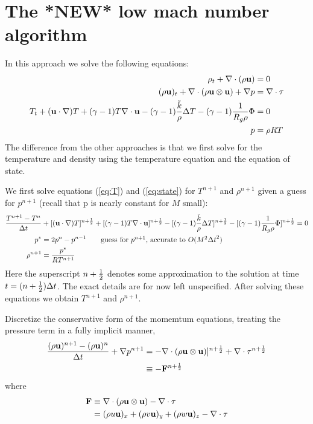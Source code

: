 \documentclass[10pt]{article}
\begin{document}
\clearpage
\section{The *NEW* low mach number algorithm}


In this approach we solve the following equations:
\begin{align}
   \rho_t + \nabla\cdot( \rho{\bf u} ) &= 0 \label{eq:rho} \\
   (\rho{\bf u})_t + \nabla\cdot( \rho {\bf u}\otimes {\bf u} ) + \nabla p & = \nabla\cdot {\bf \tau} \label{eq:u} \\
   T_t + ({\bf u}\cdot\nabla) T +(\gamma-1) T \nabla\cdot{\bf u}
       - (\gamma-1) { \tilde{k} \over \rho } \Delta T
       - (\gamma-1) { 1 \over R_g \rho } \Phi & = 0                 \label{eq:T}  \\
   p &= \rho R T \label{eq:state}
\end{align}
The difference from the other approaches is that we first solve for the temperature and density
using the temperature equation and the equation of state.


We first solve equations (\ref{eq:T}) and (\ref{eq:state}) for $T^{n+1}$ and $\rho^{n+1}$
given a guess for $p^{n+1}$ (recall that p is nearly constant for $M$ small):
\begin{align*}
{T^{n+1} - T^n \over \Delta t} &+ [({\bf u}\cdot\nabla) T]^{n+{1\over2}} + [(\gamma-1)T \nabla\cdot{\bf u}]^{n+{1\over2}}
       - [(\gamma-1) { \tilde{k} \over \rho } \Delta T]^{n+{1\over2}}
       - [(\gamma-1) { 1 \over R_g \rho } \Phi]^{n+{1\over2}} = 0                  \\
   p^* &= 2 p^n - p^{n-1} \qquad\mbox{guess for $p^{n+1}$, accurate to $O(M^2 {\Delta t}^2)$} \\
   \rho^{n+1} &=  { p^* \over R T^{n+1} }
\end{align*}
Here the superscript $n+{1\over2}$ denotes some approximation to the solution at time $t=(n+{1\over2}){\Delta t}$. The
exact details are for now left unspecified.
After solving these equations we obtain $T^{n+1}$ and $\rho^{n+1}$. 

Discretize the conservative form of the momemtum equations, treating the pressure term in a fully
implicit manner,
\begin{align}
  {(\rho{\bf u})^{n+1} - (\rho{\bf u})^{n} \over {\Delta t}}+ \nabla p^{n+1} 
         &= - \nabla\cdot( \rho {\bf u}\otimes {\bf u} )]^{n+{1\over2}} +
              \nabla\cdot {\bf \tau}^{n+{1\over2}}  \\
                          &\equiv -{\bf F}^{n+{1\over2}} \label{eq:ut} \\
\end{align}
where
\begin{align}
       {\bf F} &\equiv \nabla\cdot( \rho {\bf u}\otimes {\bf u} ) -  \nabla\cdot {\bf \tau} \\
             &= (\rho u {\bf u} )_x + (\rho v {\bf u})_y + (\rho w {\bf u} )_z - \nabla\cdot{\bf \tau}
\end{align}
\end{document}
